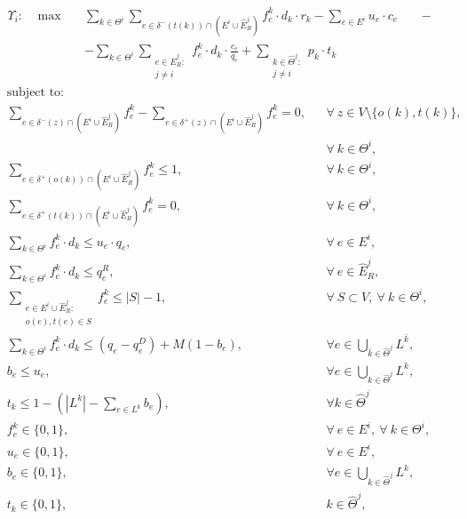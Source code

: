 \documentclass{article}
\begin{document}
    \begin{align}
        &  \Upsilon_i: \hspace{10pt} \max  &&  \sum_{k\in \Theta^i} \sum_{e \in \delta^-(t(k))\cap (E^i\cup \widehat{E}_R^j)} f_e^k \cdot d_k \cdot r_k - \sum_{e\in E^i} u_e\cdot c_e \hspace{20pt} -  \nonumber  \label{eq:IterativeA}\\
        & 								  && - \sum_{k \in \Theta^i} \sum_{\substack{e \in \widehat{E}_R^j\colon \\ j\not = i}} f_e^k \cdot d_k \cdot \frac{c_e}{q_e}   + \sum_{\substack{k \in \widehat{\Theta}^j \colon \\j\not = i}} p_k \cdot t_k
    \end{align}
    \begin{align}
        & \text{subject to:}       && \nonumber\\
& \sum_{e \in \delta^-(z)\cap (E^i\cup \widehat{E}_R^j)} f_e^k-\sum_{e \in \delta^+(z)\cap (E^i\cup \widehat{E}_R^j)} f_{e}^k  = 0,                                   && \forall\ z\in V\setminus\{o(k),t(k)\},\nonumber\\[-1em]
& && \forall\ k\in\Theta^i,  \label{eq:IterativeB}\\[1em]
& \sum_{e \in \delta^+(o(k))\cap (E^i\cup \widehat{E}_R^j)} f_e^k  \leq 1, && \forall\ k\in \Theta^i, \label{eq:IterativeC} \\
& \sum_{e \in \delta^+(t(k))\cap (E^i\cup \widehat{E}_R^j)} f_e^k  = 0,  && \forall\ k\in \Theta^i, \label{eq:IterativeD} \\
& \sum_{k \in \Theta^i} f_e^k\cdot d_k \leq u_e\cdot q_e, && \forall\ e \in E^i, \label{eq:IterativeE}  \\
& \sum_{k \in \Theta^i} f_e^k\cdot d_k \leq  q_e^R, && \forall\ e \in \widehat{E}_R^j,\label{eq:IterativeF}  \\
& \sum_{\substack{e \in E^i\cup \widehat{E}_R^j\colon \\ o(e),t(e) \in S}}  f_e^k  \leq |S| -1, && \forall\ S \subset V,\ \forall\ k \in \Theta^i, \label{eq:IterativeG}\\
&\sum_{k\in \Theta^i} f_e^k \cdot d_k \leq (q_e - q_e^D) +M(1-b_e),\quad && \forall e \in \bigcup_{\bar{k} \in \widehat{\Theta}^j}L^{\bar{k}}, \label{eq:IterativeH}\\
&b_e \leq u_e, && \forall e\in \bigcup_{k \in \widehat{\Theta}^j}L^k, \label{eq:IterativeI}\\
& t_k \leq 1 -  (|L^k|-\sum_{e \in L^k} b_e), && \forall k \in \widehat{\Theta}^j \label{eq:IterativeJ}\\
& f_e^k  \in \{0,1\}, && \forall\ e \in E^i,\ \forall\ k \in \Theta^i, \label{eq:IterativeK} \\
&  u_e   \in \{0,1\},   && \forall\ e \in E^i,  \label{eq:IterativeL}\\
& b_e \in \{0,1\}, && \forall e \in \bigcup_{k\in \widehat{\Theta}^j}L^k,\label{eq:IterativeM}\\
& t_k \in \{0,1\}, && k \in \widehat{\Theta}^j, \label{eq:IterativeN}
    \end{align}
\end{document}
